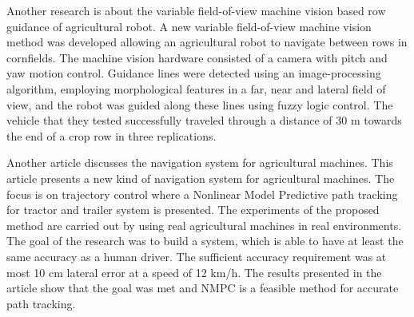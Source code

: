 Another research is about the variable field-of-view machine vision based row guidance of agricultural robot. A new variable field-of-view machine vision method was developed allowing an agricultural robot to navigate between rows in cornfields. The machine vision hardware consisted of a camera with pitch and yaw motion control. Guidance lines were detected using an image-processing algorithm, employing morphological features in a far, near and lateral field of view, and the robot was guided along these lines using fuzzy logic control. The vehicle that they tested successfully traveled through a distance of 30 m towards the end of a crop row in three replications. 

Another article discusses the navigation system for agricultural machines. This article presents a new kind of navigation system for agricultural machines. The focus is on trajectory control where a Nonlinear Model Predictive path tracking for tractor and trailer system is presented. The experiments of the proposed method are carried out by using real agricultural machines in real environments. The goal of the research was to build a system, which is able to have at least the same accuracy as a human driver. The sufficient accuracy requirement was at most 10 cm lateral error at a speed of 12 km/h. The results presented in the article show that the goal was met and NMPC is a feasible method for accurate path tracking. 



